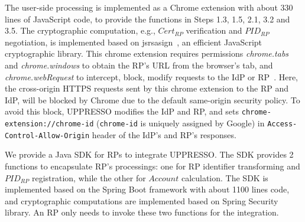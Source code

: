 The user-side processing is implemented as a Chrome extension with about 330 lines of JavaScript code, to provide the functions in Steps 1.3, 1.5, 2.1, 3.2 and 3.5.
The cryptographic computation, e.g., $Cert_{RP}$ verification and $PID_{RP}$ negotiation, is implemented based on jsrsasign~\cite{jsrsasign}, an efficient JavaScript cryptographic library.
This chrome extension requires permissions  \emph{chrome.tabs} and \emph{chrome.windows} to obtain the RP's URL from the browser's tab,  and \emph{chrome.webRequest} to intercept, block, modify requests to the IdP or RP~\cite{chromeExtension}.
Here, the cross-origin HTTPS requests sent by this chrome extension to the RP and IdP, will be blocked by Chrome due to the default same-origin security policy.
To avoid this block, UPPRESSO modifies the IdP and RP, and sets \verb+chrome-extension://chrome-id+ (\verb+chrome-id+ is uniquely assigned by Google) in \verb+Access-Control-Allow-Origin+ header of the IdP's and RP's responses.

We provide a Java SDK for RPs to integrate UPPRESSO.
The SDK provides 2 functions to encapsulate RP's processings: one for  RP identifier transforming and $PID_{RP}$ registration, while the other for $Account$ calculation. %
The SDK is implemented based on the Spring Boot framework  with about 1100 lines code, and cryptographic computations are implemented based on Spring Security library.
An RP only needs to invoke these two functions for the integration.


